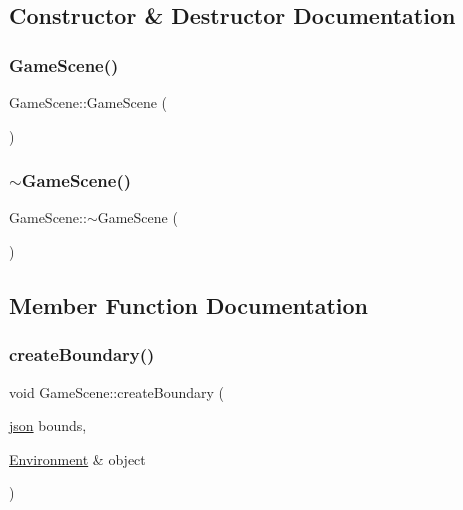 \subsection{Constructor \& Destructor Documentation}
\mbox{\label{class_game_scene_ac53cc300c8896048c0e21c67e49681b9}} 
\subsubsection{\texorpdfstring{GameScene()}{GameScene()}}
{\footnotesize\ttfamily Game\+Scene\+::\+Game\+Scene (\begin{DoxyParamCaption}{ }\end{DoxyParamCaption})}

\mbox{\label{class_game_scene_add5bc48c372aaa7f526c02558a8adf00}} 
\subsubsection{\texorpdfstring{$\sim$GameScene()}{~GameScene()}}
{\footnotesize\ttfamily Game\+Scene\+::$\sim$\+Game\+Scene (\begin{DoxyParamCaption}{ }\end{DoxyParamCaption})}



\subsection{Member Function Documentation}
\mbox{\label{class_game_scene_ab012fd64f76ebf2c329eee38cb1db5d8}} 
\subsubsection{\texorpdfstring{createBoundary()}{createBoundary()}}
{\footnotesize\ttfamily void Game\+Scene\+::create\+Boundary (\begin{DoxyParamCaption}\item[{\mbox{\hyperlink{_level_loader_8h_ab701e3ac61a85b337ec5c1abaad6742d}{json}}}]{bounds,  }\item[{\mbox{\hyperlink{class_environment}{Environment}} \&}]{object }\end{DoxyParamCaption})}

